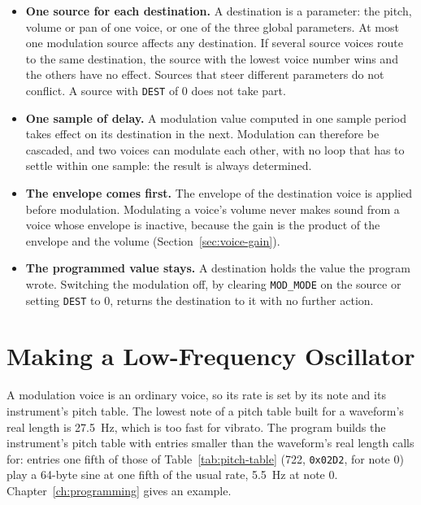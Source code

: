 \begin{itemize}
	\item \textbf{One source for each destination.} A destination is a parameter: the pitch, volume or pan of one voice, or one of the three global parameters. At most one modulation source affects any destination. If several source voices route to the same destination, the source with the lowest voice number wins and the others have no effect. Sources that steer different parameters do not conflict. A
	      source with \texttt{DEST} of 0 does not take part.
	\item \textbf{One sample of delay.} A modulation value computed in one sample period takes effect on its destination in the next. Modulation can therefore be cascaded, and two voices can modulate each other, with no
	      loop that has to settle within one sample: the result is always determined.
	\item \textbf{The envelope comes first.} The envelope of the destination voice is applied before modulation. Modulating a
	      voice's volume never makes sound from a voice whose envelope is inactive, because the gain is the product of the
	      envelope and the volume (Section~\ref{sec:voice-gain}).
	\item \textbf{The programmed value stays.} A destination holds the value the program wrote. Switching the modulation
	      off, by clearing \texttt{MOD\_MODE} on the source or setting \texttt{DEST} to 0, returns the destination to it with
	      no further action.
\end{itemize}

\section{Making a Low-Frequency Oscillator}

A modulation voice is an ordinary voice, so its rate is set by its note and its instrument's pitch table. The lowest
note of a pitch table built for a waveform's real length is 27.5~Hz, which is too fast for vibrato. The program builds
the instrument's pitch table with entries smaller than the waveform's real length calls for: entries one fifth of those
of Table~\ref{tab:pitch-table} (722, \texttt{0x02D2}, for note 0) play a 64-byte sine at one fifth of the usual rate,
5.5~Hz at note 0. Chapter~\ref{ch:programming} gives an example.
